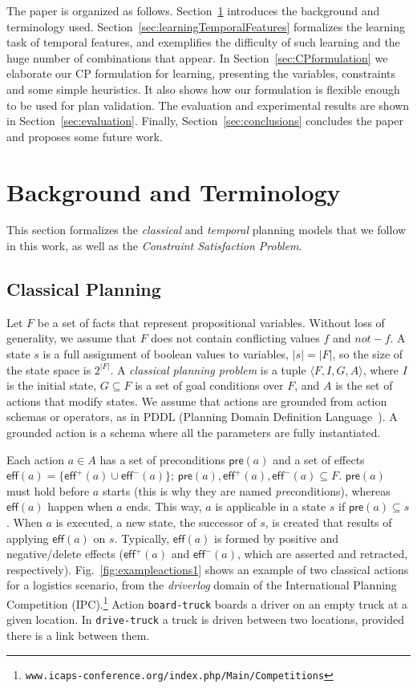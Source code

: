 \documentclass[10pt,journal,compsoc]{IEEEtran}
\newcommand{\tup}[1]{{\langle #1 \rangle}}
\newcommand{\pre}{\mathsf{pre}}    %
\newcommand{\eff}{\mathsf{eff}}    %
\begin{document}
The paper is organized as follows. Section~\ref{sec:background} introduces the background and terminology used. Section~\ref{sec:learningTemporalFeatures} formalizes the learning task of temporal features, and exemplifies the difficulty of such learning and the huge number of combinations that appear. In Section~\ref{sec:CPformulation} we elaborate our CP formulation for learning, presenting the variables,  constraints and some simple heuristics. It also shows how our formulation is flexible enough to be used for plan validation.
The evaluation and experimental results are shown in Section~\ref{sec:evaluation}. Finally, Section~\ref{sec:conclusions} concludes the paper and proposes some future work.


\section{Background and Terminology}
\label{sec:background}

This section formalizes the {\em classical} and {\em temporal} planning models that we follow in this work, as well as the {\em Constraint Satisfaction Problem}.


\subsection{Classical Planning}
\label{sec:classicalplanning}


Let $F$ be a set of facts that represent propositional variables.
Without loss of generality, we assume that $F$ does not contain conflicting values $f$ and $not-f$.
A state $s$ is a full assignment of boolean values to variables, $|s|=|F|$, so the size of the state space is $2^{|F|}$.
A {\em classical planning problem} is a tuple $\tup{F,I,G,A}$, where $I$ is the initial state, $G \subseteq F$ is a set of goal conditions over $F$, and $A$ is the set of actions that modify states. We assume that actions are grounded from action schemas or operators, as in PDDL (Planning Domain Definition Language~\cite{fox2003pddl2,ghallab2004automated}). A grounded action is a schema where all the parameters are fully instantiated.

Each action $a \in A$ has a set of preconditions $\pre(a)$ and a set of effects $\eff(a)=\{\eff^+(a) \cup \eff^-(a)\}$; $\pre(a), \eff^+(a), \eff^-(a) \subseteq F$. $\pre(a)$ must hold before $a$ starts (this is why they are named \emph{pre}conditions), whereas $\eff(a)$ happen when $a$ ends. This way, $a$ is applicable in a state $s$ if $\pre(a) \subseteq s$. When $a$ is executed, a new state, the successor of $s$, is created that results of applying $\eff(a)$ on $s$. Typically, $\eff(a)$ is formed by positive and negative/delete effects ($\eff^+(a)$ and $\eff^-(a)$, which are asserted and retracted, respectively). Fig.~\ref{fig:exampleactions1} shows an example of two classical actions for a logistics scenario, from the \emph{driverlog} domain of the International Planning Competition (IPC).\footnote{{\scriptsize \texttt{www.icaps-conference.org/index.php/Main/Competitions}}} Action \texttt{board-truck} boards a driver on an empty truck at a given location. In \texttt{drive-truck} a truck is driven between two locations, provided there is a link between them.
\end{document}
